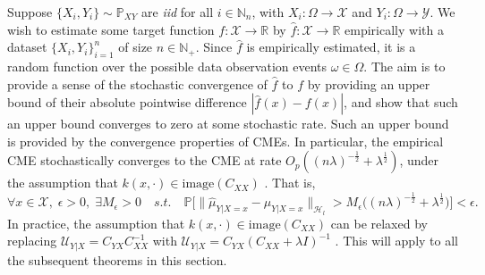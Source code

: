 \documentclass{llncs}
\numberwithin{equation}{section}
\numberwithin{table}{section}
\numberwithin{algorithm}{section}
\begin{document}
	Suppose $\{X_{i}, Y_{i}\} \sim \mathbb{P}_{X Y}$ are \textit{iid} for all $i \in \mathbb{N}_{n}$, with $X_{i} : \Omega \to \mathcal{X}$ and $Y_{i} : \Omega \to \mathcal{Y}$. We wish to estimate some target function $f : \mathcal{X} \to \mathbb{R}$ by $\hat{f} : \mathcal{X} \to \mathbb{R}$ empirically with a dataset $\{X_{i}, Y_{i}\}_{i = 1}^{n}$ of size $n \in \mathbb{N}_{+}$. Since $\hat{f}$ is empirically estimated, it is a random function over the possible data observation events $\omega \in \Omega$. The aim is to provide a sense of the stochastic convergence of $\hat{f}$ to $f$ by providing an upper bound of their absolute pointwise difference $| \hat{f}(x) - f(x) |$, and show that such an upper bound converges to zero at some stochastic rate. Such an upper bound is provided by the convergence properties of \glspl{CME}. In particular, the empirical \gls{CME} stochastically converges to the \gls{CME} at rate $O_{p}((n \lambda)^{-\frac{1}{2}} + \lambda^{\frac{1}{2}})$, under the assumption that $k(x, \cdot) \in \mathrm{image}(C_{XX})$ \cite[Theorem 6]{song2009hilbert}. That is,
	\begin{equation}
	\forall x \in \mathcal{X}, \; \epsilon > 0, \; \exists M_{\epsilon} > 0 \quad s.t. \quad \mathbb{P}\Big[\big\| \hat{\mu}_{Y | X = x} - \mu_{Y | X = x} \big\|_{\mathcal{H}_{l}} > M_{\epsilon} \Big((n \lambda)^{-\frac{1}{2}} + \lambda^{\frac{1}{2}}\Big)\Big] < \epsilon.
	\label{eq:empirical_conditional_embedding_stochastic_convergence}
	\end{equation}
	In practice, the assumption that $k(x, \cdot) \in \mathrm{image}(C_{XX})$ can be relaxed by replacing $\mathcal{U}_{Y | X} = C_{YX} C_{XX}^{-1}$ with $\mathcal{U}_{Y | X} = C_{YX} (C_{XX} + \lambda I)^{-1}$ \citep{song2013kernel}. This will apply to all the subsequent theorems in this section.
\end{document}
